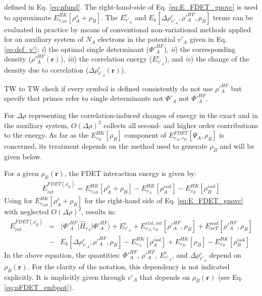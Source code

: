 \documentclass[journal=jctcce,manuscript=article]{achemso}
\begin{document}
defined in Eq. \ref{eq:nfund}. 
The right-hand-side of Eq. \ref{eq:E_FDET_gnovc} is used to approximate $E_{v_{AB}}^{HK}[\rho_A^{o}+\rho_B]$.
The  $E^{c}_{v'_A}$ and  $E_k[\Delta \rho^{c}_{v'_A}, \rho'^{HF}_A, \rho_B]$
 terms can be evaluated in practice by means of conventional non-variational methods 
applied for an auxiliary system of $N_A$ electrons in the potential $v'_A$ given in Eq. \ref{eq:def_v'}:  {\it i})
the optimal single determinant ($\Phi'^{HF}_{A}$), {\it ii}) the corresponding density ($\rho'^{HF}_{A}(\mathbf{r})$), 
{\it iii}) the correlation energy ($E^{c}_{v'_A}$), and {\it iv}) the change of the density due to correlation ($\Delta \rho^{c}_{v'_A}(\mathbf{r})$).  

{\color{red} TW to TW check if every symbol is defined consistently do not use $\rho'^{HF}_{A}$ but specify that primes refer to single determinants not 
$\Phi'_{A}$ not $\Phi'^{HF}_{A}$.}


For $\Delta\rho$  representing the correlation-induced changes of energy in the exact and in the auxiliary system, 
 $O(\Delta\rho)^2$ collects all second- and higher order contributions to the energy. 
As far as the $E^{HK}_{v_B}[\rho_B]$ component of ${ E}_{v_A,v_B}^{FDET}[\Psi_{A},\rho_B]$ is concerned,
its treatment depends on the method used to generate $\rho_B$ and will be given below.


For a given $\rho_B(\mathbf{r})$,
the FDET interaction energy is given by:
\begin{eqnarray}
E_{int}^{FDET(\rho_B)}=E_{v_{AB}}^{HK}[\rho_A^{o}+\rho_B] - E_{v_A}^{HK}[\rho_A^{isol}] - 
E_{v_B}^{HK}[\rho_B^{isol}] \label{eq:eint0}
\end{eqnarray}
Using for  $E_{v_{AB}}^{HK}[\rho_A^{o}+\rho_B]$ for the right-hand side of Eq. \ref{eq:E_FDET_gnovc} with  neglected $O(\Delta\rho)^2$, results in:
\begin{eqnarray}
E_{int}^{FDET(\rho_B)}&=&
\langle\Phi'^{HF}_{A}\vert \hat{H}_{v_A}\vert \Phi'^{HF}_{A}\rangle + E^{c}_{v'_A}
+ E^{elst,int}_{v_A,v_B}[\rho'^{HF}_A,\rho_B] + {E}_{xcT}^{nad}[\rho'^{HF}_A,\rho_B] \label{eq:eint1}\\
&-&     E_k[\Delta \rho^{c}_{v'_A}, \rho'^{HF}_A, \rho_B]  - E_{v_A}^{HK}[\rho_A^{isol}] + {E}^{HK}_{v_B}[\rho_B]  - 
E_{v_B}^{HK}[\rho_B^{isol}] \nonumber
\end{eqnarray}
In the above equation,  the quantities:  $\Phi'^{HF}_{A}$, $\rho'^{HF}_A$, $E^{c}_{v'_A}$, and $\Delta \rho^{c}_{v'_A}$  depend on $\rho_B(\mathbf{r})$. For the clarity of the notation, this dependency is not indicated explicitly. It is implicitly given through  $v'_A$  that depends on  $\rho_B(\mathbf{r})$ (see Eq. \ref{eq:nFDET_embpot}). 
\end{document}
